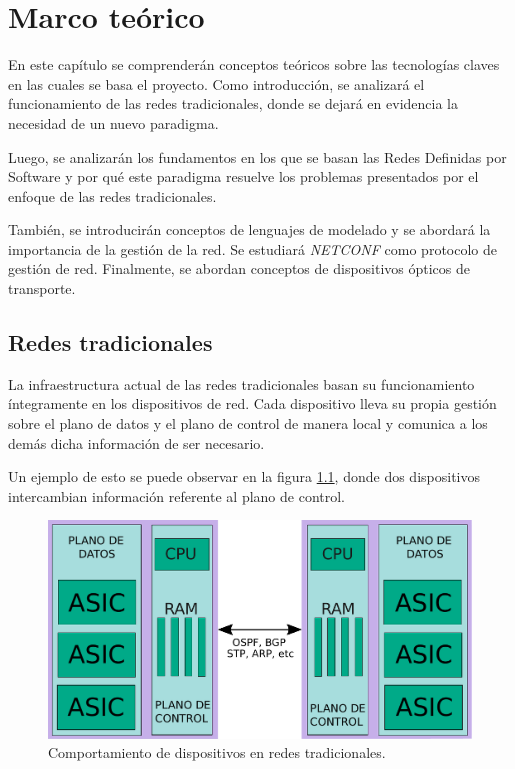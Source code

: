 \chapter{Marco teórico} %

\label{Chapter2} %
En este capítulo se comprenderán conceptos teóricos sobre las tecnologías claves en las cuales se basa el proyecto. Como introducción, se analizará el funcionamiento de las redes tradicionales, donde se dejará en evidencia la necesidad de un nuevo paradigma. 

Luego, se analizarán los fundamentos en los que se basan las Redes Definidas por Software y por qué este paradigma resuelve los problemas presentados por el enfoque de las redes tradicionales. 

También, se introducirán conceptos de lenguajes de modelado y se abordará la importancia de la gestión de la red. Se estudiará \textit{NETCONF} como protocolo de gestión de red. Finalmente, se abordan conceptos de dispositivos ópticos de transporte.

\section{Redes tradicionales} \label{sec:rdtr}

La infraestructura actual de las redes tradicionales basan su funcionamiento íntegramente en los dispositivos de red. Cada dispositivo lleva su propia gestión sobre el plano de datos y el plano de control de manera local y comunica a los demás dicha información de ser necesario. 

Un ejemplo de esto se puede observar en la figura \ref{fig:dev_tradicional}, donde dos dispositivos intercambian información referente al plano de control.
\\

\begin{figure}[htbp]
	\centering
	\includegraphics[scale=0.6]{Figures/dispositivo-tradicional.pdf}
	\caption{Comportamiento de dispositivos en redes tradicionales.}
	\label{fig:dev_tradicional}
  \end{figure}


